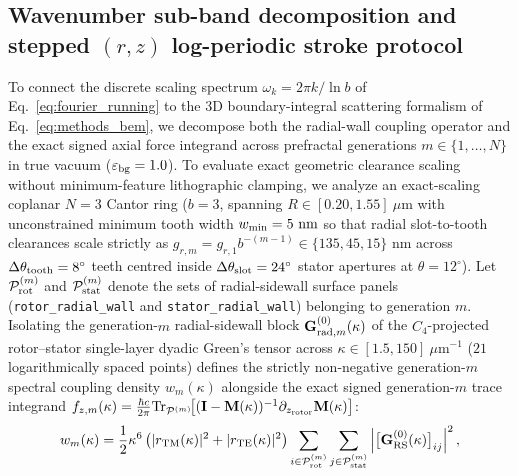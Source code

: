 \documentclass[pdflatex,sn-nature]{sn-jnl}
\begin{document}
\subsection*{Wavenumber sub-band decomposition and stepped $(r,z)$ log-periodic stroke protocol}
To connect the discrete scaling spectrum $\omega_k = 2\pi k / \ln b$ of Eq.~\eqref{eq:fourier_running} to the 3D boundary-integral scattering formalism of Eq.~\eqref{eq:methods_bem}, we decompose both the radial-wall coupling operator and the exact signed axial force integrand across prefractal generations $m \in \{1, \dots, N\}$ in true vacuum ($\varepsilon_{\rm bg}=1.0$). To evaluate exact geometric clearance scaling without minimum-feature lithographic clamping, we analyze an exact-scaling coplanar $N=3$ Cantor ring ($b=3$, spanning $R \in [0.20, 1.55]\ \mu\text{m}$ with unconstrained minimum tooth width $w_{\rm min} = 5\text{ nm}$ so that radial slot-to-tooth clearances scale strictly as $g_{r,m} = g_{r,1} b^{-(m-1)} \in \{135, 45, 15\}\text{ nm}$ across $\Delta\theta_{\rm tooth} = 8^\circ$ teeth centred inside $\Delta\theta_{\rm slot} = 24^\circ$ stator apertures at $\theta = 12^\circ$). Let $\mathcal{P}_{\rm rot}^{(m)}$ and $\mathcal{P}_{\rm stat}^{(m)}$ denote the sets of radial-sidewall surface panels (\texttt{rotor\_radial\_wall} and \texttt{stator\_radial\_wall}) belonging to generation $m$. Isolating the generation-$m$ radial-sidewall block $\mathbf{G}_{{\rm rad},m}^{(0)}(\kappa)$ of the $C_4$-projected rotor--stator single-layer dyadic Green's tensor across $\kappa \in [1.5, 150]\ \mu\text{m}^{-1}$ ($21$ logarithmically spaced points) defines the strictly non-negative generation-$m$ spectral coupling density $w_m(\kappa)$ alongside the exact signed generation-$m$ trace integrand $f_{z,m}(\kappa) = \frac{\hbar c}{2\pi}\mathrm{Tr}_{\mathcal{P}^{(m)}}\!\bigl[(\mathbf{I}-\mathbf{M}(\kappa))^{-1}\partial_{z_{\rm rotor}}\mathbf{M}(\kappa)\bigr]$:
\begin{equation}
w_m(\kappa) = \frac{1}{2}\kappa^6 \left( |r_{\rm TM}(\kappa)|^2 + |r_{\rm TE}(\kappa)|^2 \right) \sum_{i \in \mathcal{P}_{\rm rot}^{(m)}} \sum_{j \in \mathcal{P}_{\rm stat}^{(m)}} \left| \bigl[\mathbf{G}_{\rm RS}^{(0)}(\kappa)\bigr]_{ij} \right|^2,
\label{eq:methods_spectral_subband}
\end{equation}
\end{document}
